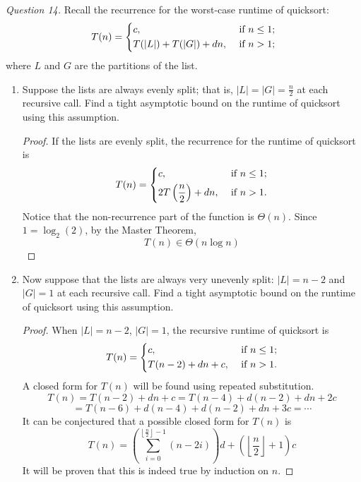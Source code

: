 \documentclass[11pt]{article}
\begin{document}
    \textit{Question 14.} Recall the recurrence for the worst-case runtime of quicksort:
    \[
        T(n)=\begin{dcases}
            c, &\text{ if } n\leq 1;\\
            T(|L|)+T(|G|) + dn, &\text{ if } n>1;\\
        \end{dcases}
    \]
    where \(L\) and \(G\) are the partitions of the list.
    \begin{enumerate}
        \item Suppose the lists are always evenly split; that is, \(|L| = |G| = \frac{n}{2}\) at each recursive call. Find a tight asymptotic bound on the runtime of quicksort using this assumption.
        
        \begin{proof}
            If the lists are evenly split, the recurrence for the runtime of quicksort is
            \[
                T(n)=\begin{dcases}
                    c, &\text{ if } n \leq 1 ;\\
                    2T\left(\frac{n}{2}\right) + dn, &\text{ if } n >1 .
                \end{dcases}
            \]
            Notice that the non-recurrence part of the function is \(\Theta (n)\). Since \(1 = \log _2(2)\), by the Master Theorem,
            \[
                T(n) \in \Theta(n\log n)
            \]
        \end{proof}
        \item Now suppose that the lists are always very unevenly split: \(|L| = n-2\) and \(|G| = 1\) at each recursive call. Find a tight asymptotic bound on the runtime of quicksort using this assumption.
        
        \begin{proof}
            When \(|L| = n-2\), \(|G| =1\), the recursive runtime of quicksort is
            \[
                T(n)= \begin{dcases}
                    c, &\text{ if } n \leq 1 ;\\
                    T(n-2) + dn + c, &\text{ if } n > 1 .
                \end{dcases}
            \]
            A closed form for \(T(n)\) will be found using repeated substitution.
            \[
                T(n) = T(n-2) + dn + c = T(n-4) + d(n-2) + dn + 2c
            \]
            \[
                = T(n-6) + d(n-4) + d(n-2) + dn + 3c = \cdots
            \]
            It can be conjectured that a possible closed form for \(T(n)\) is
            \[
                T(n) = \left(\sum_{i=0}^{\left\lfloor \frac{n}{2} \right\rfloor - 1} (n-2i)\right) d + \left(\left\lfloor\frac{n}{2}\right\rfloor + 1\right) c
            \]
            It will be proven that this is indeed true by induction on \(n\).


\end{proof}
\end{enumerate}
\end{document}
